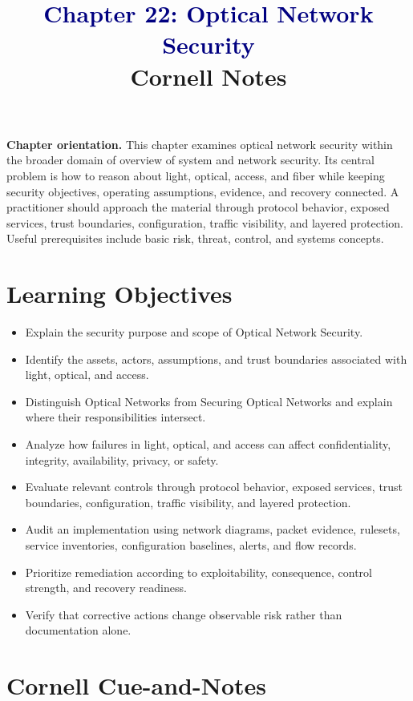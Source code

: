 \documentclass[11pt]{article}
\title{\textcolor{Navy}{Chapter 22: Optical Network Security}\\[2mm]\large Cornell Notes}
\author{}
\date{}
\begin{document}
\maketitle
\thispagestyle{fancy}
\vspace{-1.5em}
\begin{orientationbox}
\textbf{Chapter orientation.} This chapter examines optical network security within the broader domain of overview of system and network security. Its central problem is how to reason about light, optical, access, and fiber while keeping security objectives, operating assumptions, evidence, and recovery connected. A practitioner should approach the material through protocol behavior, exposed services, trust boundaries, configuration, traffic visibility, and layered protection. Useful prerequisites include basic risk, threat, control, and systems concepts.
\end{orientationbox}
\section*{Learning Objectives}
\begin{itemize}
\item Explain the security purpose and scope of Optical Network Security.
\item Identify the assets, actors, assumptions, and trust boundaries associated with light, optical, and access.
\item Distinguish Optical Networks from Securing Optical Networks and explain where their responsibilities intersect.
\item Analyze how failures in light, optical, and access can affect confidentiality, integrity, availability, privacy, or safety.
\item Evaluate relevant controls through protocol behavior, exposed services, trust boundaries, configuration, traffic visibility, and layered protection.
\item Audit an implementation using network diagrams, packet evidence, rulesets, service inventories, configuration baselines, alerts, and flow records.
\item Prioritize remediation according to exploitability, consequence, control strength, and recovery readiness.
\item Verify that corrective actions change observable risk rather than documentation alone.
\end{itemize}
\section*{Cornell Cue-and-Notes}
\end{document}
